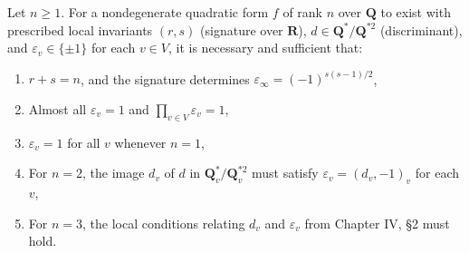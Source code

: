 Let $n \geq 1$. For a nondegenerate quadratic form $f$ of rank $n$ over $\mathbf{Q}$ to exist with prescribed local invariants $(r, s)$ (signature over $\mathbf{R}$), $d \in \mathbf{Q}^*/\mathbf{Q}^{*2}$ (discriminant), and $\varepsilon_v \in \{\pm 1\}$ for each $v \in V$, it is necessary and sufficient that:
\begin{enumerate}
\item[(1)] $r + s = n$, and the signature determines $\varepsilon_\infty = (-1)^{s(s-1)/2}$,
\item[(2)] Almost all $\varepsilon_v = 1$ and $\prod_{v \in V} \varepsilon_v = 1$,
\item[(3)] $\varepsilon_v = 1$ for all $v$ whenever $n = 1$,
\item[(4)] For $n = 2$, the image $d_v$ of $d$ in $\mathbf{Q}_v^*/\mathbf{Q}_v^{*2}$ must satisfy $\varepsilon_v = (d_v, -1)_v$ for each $v$,
\item[(5)] For $n = 3$, the local conditions relating $d_v$ and $\varepsilon_v$ from Chapter IV, §2 must hold.
\end{enumerate}
